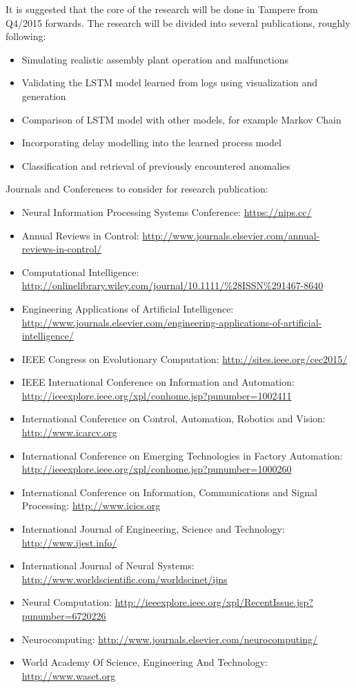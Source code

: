 \documentclass[a4paper,10pt]{article}
\begin{document}
It is suggested that the core of the research will be done in Tampere from Q4/2015 forwards.
The research will be divided into several publications, roughly following:
\begin{itemize}
 \item Simulating realistic assembly plant operation and malfunctions
 \item Validating the LSTM model learned from logs using visualization and generation
 \item Comparison of LSTM model with other models, for example Markov Chain
 \item Incorporating delay modelling into the learned process model
 \item Classification and retrieval of previously encountered anomalies
\end{itemize}
Journals and Conferences to consider for research publication:
\begin{itemize}
 \item Neural Information Processing Systems Conference: \url{https://nips.cc/}
 \item Annual Reviews in Control: \url{http://www.journals.elsevier.com/annual-reviews-in-control/}
 \item Computational Intelligence: \url{http://onlinelibrary.wiley.com/journal/10.1111/%28ISSN%291467-8640}
 \item Engineering Applications of Artificial Intelligence: \url{http://www.journals.elsevier.com/engineering-applications-of-artificial-intelligence/}
 \item IEEE Congress on Evolutionary Computation: \url{http://sites.ieee.org/cec2015/}
 \item IEEE International Conference on Information and Automation: \url{http://ieeexplore.ieee.org/xpl/conhome.jsp?punumber=1002411}
 \item International Conference on Control, Automation, Robotics and Vision: \url{http://www.icarcv.org}
 \item International Conference on Emerging Technologies in Factory Automation: \url{http://ieeexplore.ieee.org/xpl/conhome.jsp?punumber=1000260}
 \item International Conference on Information, Communications and Signal Processing: \url{http://www.icics.org}
 \item International Journal of Engineering, Science and Technology: \url{http://www.ijest.info/}
 \item International Journal of Neural Systems: \url{http://www.worldscientific.com/worldscinet/ijns}
 \item Neural Computation: \url{http://ieeexplore.ieee.org/xpl/RecentIssue.jsp?punumber=6720226}
 \item Neurocomputing: \url{http://www.journals.elsevier.com/neurocomputing/}
 \item World Academy Of Science, Engineering And Technology: \url{http://www.waset.org}
\end{itemize}
\end{document}
